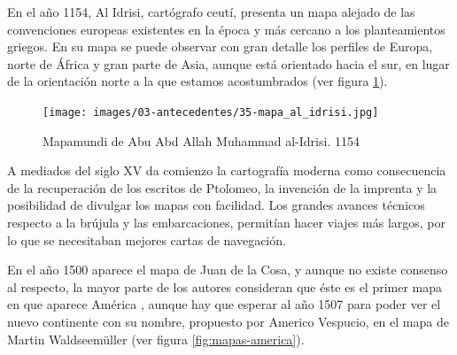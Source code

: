 En el año 1154, Al Idrisi, cartógrafo ceutí, presenta un mapa alejado de las convenciones europeas existentes en la época y más cercano a los planteamientos griegos. En su mapa se puede observar con gran detalle los perfiles de Europa, norte de África y gran parte de Asia, aunque está orientado hacia el sur, en lugar de la orientación norte a la que estamos acostumbrados (ver figura \ref{fig:mapa-al-idrisi}).

\begin{figure}[h!btp]
\centering
\texttt{[image: images/03-antecedentes/35-mapa\_al\_idrisi.jpg]}
\caption{Mapamundi de Abu Abd Allah Muhammad al-Idrisi. 1154}
\label{fig:mapa-al-idrisi}
\end{figure}

A mediados del siglo XV da comienzo la cartografía moderna como consecuencia de la recuperación de los escritos de Ptolomeo, la invención de la imprenta y la posibilidad de divulgar los mapas con facilidad. Los grandes avances técnicos respecto a la brújula y las embarcaciones, permitían hacer viajes más largos, por lo que se necesitaban mejores cartas de navegación.

En el año 1500 aparece el mapa de Juan de la Cosa, y aunque no existe consenso al respecto, la mayor parte de los autores consideran que éste es el primer mapa en que aparece América \cite{Verl06}, aunque hay que esperar al año 1507 para poder ver el nuevo continente con su nombre, propuesto por Americo Vespucio, en el mapa de Martin Waldseemüller (ver figura \ref{fig:mapas-america}).

